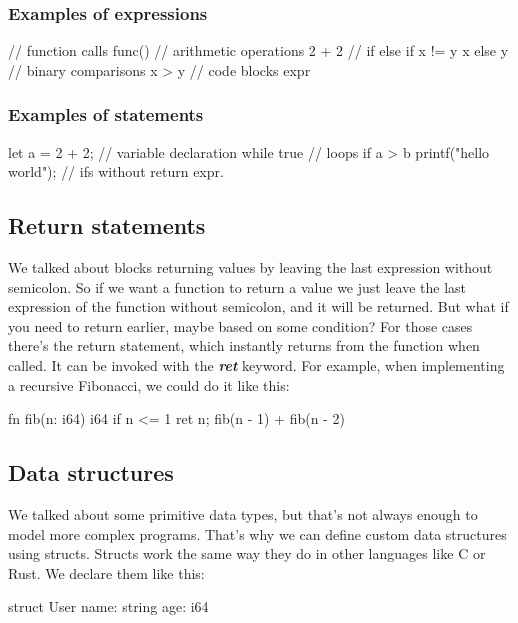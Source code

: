 ﻿\documentclass[10pt,a4paper,twocolumn,twoside]{article}
\begin{document}
\subsubsection{Examples of expressions}
\begin{code}
// function calls
func()
// arithmetic operations
2 + 2 
// if else
if x != y { x } else { y }
// binary comparisons
x > y 
// code blocks
{ expr }
\end{code}

\subsubsection{Examples of statements}
\begin{code}
let a = 2 + 2;  // variable declaration
while true {  } // loops
if a > b { printf("hello world"); } // ifs without return expr.
\end{code}

\subsection{Return statements}
We talked about blocks returning values by leaving the last expression without
semicolon. So if we want a function to return a value we just leave the last
expression of the function without semicolon, and it will be returned. But what
if you need to return earlier, maybe based on some condition? For those cases
there's the return statement, which instantly returns from the function when
called. It can be invoked with the \textbf{\textit{ret}} keyword. For example,
when implementing a recursive Fibonacci, we could do it like this:

\begin{code}
fn fib(n: i64) i64 {
    if n <= 1 {
        ret n;
    }
    fib(n - 1) + fib(n - 2)
}
\end{code}

\subsection{Data structures}
We talked about some primitive data types, but that's not always enough to model
more complex programs. That's why we can define custom data structures using 
structs. Structs work the same way they do in other languages like C or Rust.
We declare them like this:

\begin{code}
struct User {
    name: string
    age: i64
}
\end{code}
\end{document}
